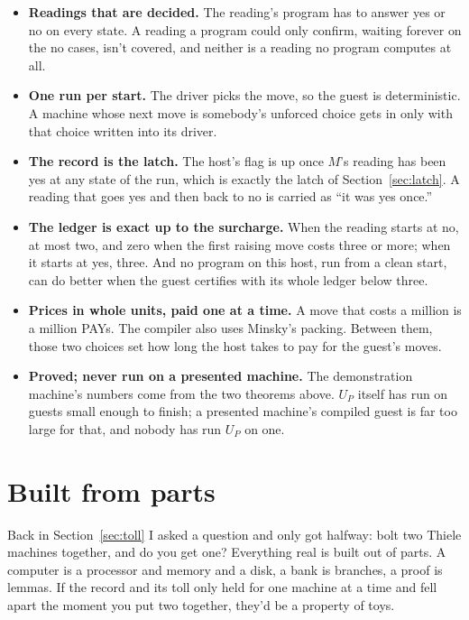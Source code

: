 \documentclass[11pt,twoside]{article}
\theoremstyle{thielethm}
\theoremstyle{thieledef}
\theoremstyle{thieledef}
\theoremstyle{thieledef}
\theoremstyle{thielethm}
\theoremstyle{thieleobs}
\theoremstyle{thielethm}
\begin{document}
\begin{itemize}
\item \textbf{Readings that are decided.} The reading's program has to answer yes or no on every
state. A reading a program could only confirm, waiting forever on the no cases, isn't covered, and
neither is a reading no program computes at all.
\item \textbf{One run per start.} The driver picks the move, so the guest is deterministic. A
machine whose next move is somebody's unforced choice gets in only with that choice written into its
driver.
\item \textbf{The record is the latch.} The host's flag is up once $M$'s reading has been yes at
any state of the run, which is exactly the latch of Section~\ref{sec:latch}. A reading that goes
yes and then back to no is carried as ``it was yes once.''
\item \textbf{The ledger is exact up to the surcharge.} When the reading starts at no, at most two,
and zero when the first raising
move costs three or more; when it starts at yes, three. And no program on this host, run from a clean start,
can do better when the guest certifies with its whole ledger below three.
\item \textbf{Prices in whole units, paid one at a time.} A move that costs a million is a million
PAYs. The compiler also uses Minsky's packing. Between them, those two choices set how long the
host takes to pay for the guest's moves.
\item \textbf{Proved; never run on a presented machine.} The demonstration machine's numbers come from the two theorems
above. $U_P$ itself has run on guests small enough to finish; a presented machine's compiled guest
is far too large for that, and nobody has run $U_P$ on one.
\end{itemize}


\section{Built from parts}
\label{sec:parts}

Back in Section~\ref{sec:toll} I asked a question and only got halfway: bolt two Thiele
machines together, and do you get one? Everything real is built out of parts. A computer is a
processor and memory and a disk, a bank is branches, a proof is lemmas. If the record and its toll
only held for one machine at a time and fell apart the moment you put two together, they'd be a
property of toys.
\end{document}

